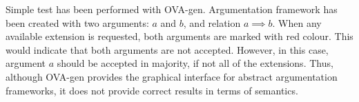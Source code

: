 Simple test has been performed with OVA-gen. Argumentation framework has been created with two arguments: $a$ and $b$, and relation $a \implies b$. When any available extension is requested, both arguments are marked with red colour. This would indicate that both arguments are not accepted. However, in this case, argument $a$ should be accepted in majority, if not all of the extensions. Thus, although OVA-gen provides the graphical interface for abstract argumentation frameworks, it does not provide correct results in terms of semantics.
